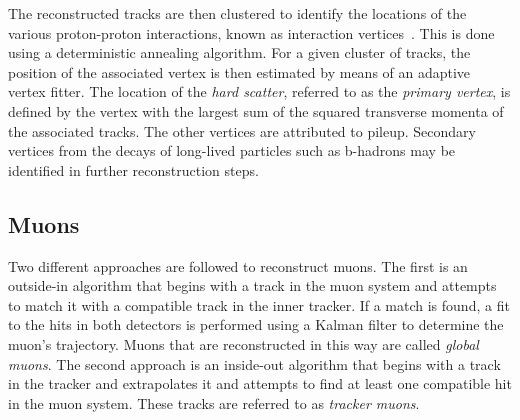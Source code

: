 

The reconstructed tracks are then clustered to identify the locations of the 
various proton-proton interactions, known as interaction 
vertices~\cite{track-vertex}. This is done using a deterministic annealing 
algorithm. For a given cluster of tracks, the position of the associated vertex 
is then estimated by means of an adaptive vertex fitter.
The location of the \textit{hard scatter}, referred to as the \textit{primary 
vertex}, is defined by the vertex with the largest sum of the squared 
transverse momenta of the associated tracks. The other vertices are attributed 
to pileup. Secondary vertices from the decays of long-lived particles such as 
b-hadrons may be identified in further reconstruction steps.


\subsection{Muons}
Two different approaches are followed to reconstruct muons. The first is an 
outside-in algorithm that begins with a track in the muon system and attempts 
to match it with a compatible track in the inner tracker. If a match is found, 
a fit to the hits in both detectors is performed using a Kalman filter to 
determine the muon's trajectory. Muons that are reconstructed in this way are 
called \textit{global muons}. The second approach is an inside-out algorithm 
that begins with a track in the tracker and extrapolates it and attempts to 
find at least one compatible hit in the muon system. These tracks are referred 
to as \textit{tracker muons}.

